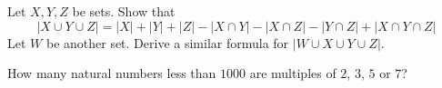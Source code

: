 \begin{exercise}
\label{exSizeOfUnionOf3Or4Sets}
Let $X,Y,Z$ be sets. Show that
\[ |X \cup Y \cup Z| = |X| + |Y| + |Z| - |X \cap Y| - |X \cap Z| - |Y \cap Z| + |X \cap Y \cap Z| \]
Let $W$ be another set. Derive a similar formula for $|W \cup X \cup Y \cup Z|$.
\end{exercise}



\begin{exercise}
How many natural numbers less than $1000$ are multiples of $2$, $3$, $5$ or $7$?
\end{exercise}

